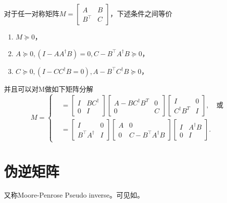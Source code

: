 \begin{subappendices}
\begin{theorem}
  \label{theorem:simple-schur-positivedef}
  对于任一对称矩阵$M = \begin{bmatrix} A & B \\ B^{\top} & C\end{bmatrix}$，下述条件之间等价
  \begin{enumerate}
    \item $M \succeq 0$，
    \item $A\succeq 0, (I-AA^{\dagger} B) =0, C- B^{\top} A^{\dagger} B \succeq 0$，
    \item $C \succeq 0, (I-CC^{\dagger} B = 0), A - B^{\top} C^{\dagger} B \succeq 0$，
  \end{enumerate}
  并且可以对M做如下矩阵分解
  \begin{equation*}
    M = \begin{cases}
      &  = \begin{bmatrix}
      I & BC^{\dagger} \\ 0 & I
      \end{bmatrix}
      \begin{bmatrix}
        A - BC^{\dagger} B^{T} & 0 \\ 0 & C
      \end{bmatrix}
      \begin{bmatrix}
        I & 0 \\ C^{\dagger} B^{T} & I
      \end{bmatrix}, \quad \text{或}\\
      & = \begin{bmatrix}
      I & 0 \\ B^{\top} A^{\dagger} & I
      \end{bmatrix}
      \begin{bmatrix}
        A & 0  \\ 0 & C-B^{\top} A^{\dagger} B
      \end{bmatrix}
      \begin{bmatrix}
        I & A^{\dagger} B \\ 0 & I
      \end{bmatrix}.
    \end{cases}
  \end{equation*}
\end{theorem}

\section{伪逆矩阵}
\label{sec:simple-pseudo}
又称Moore-Penrose Pseudo inverse。可见如\cite[Ch.5]{Bapat:2012ue}。


\end{subappendices}
